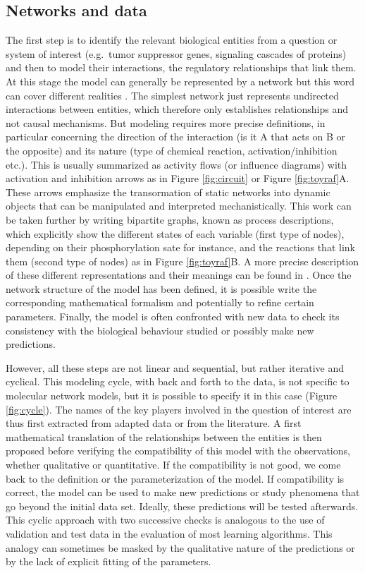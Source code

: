 \documentclass[a4paper,12pt,twoside,onecolumn,openright,final,oldfontcommands]{memoir}
\begin{document}
\subsection{Networks and data}\label{networks-and-data}

The first step is to identify the relevant biological entities from a
question or system of interest (e.g.~tumor suppressor genes, signaling
cascades of proteins) and then to model their interactions, the
regulatory relationships that link them. At this stage the model can
generally be represented by a network but this word can cover different
realities \citep{le2015quantitative}. The simplest network just
represents undirected interactions between entities, which therefore
only establishes relationships and not causal mechanisms. But modeling
requires more precise definitions, in particular concerning the
direction of the interaction (is it A that acts on B or the opposite)
and its nature (type of chemical reaction, activation/inhibition etc.).
This is usually summarized as activity flows (or influence diagrams)
with activation and inhibition arrows as in Figure \ref{fig:circuit} or
Figure \ref{fig:toyraf}A. These arrows emphasize the transormation of
static networks into dynamic objects that can be manipulated and
interpreted mechanistically. This work can be taken further by writing
bipartite graphs, known as process descriptions, which explicitly show
the different states of each variable (first type of nodes), depending
on their phosphorylation sate for instance, and the reactions that link
them (second type of nodes) as in Figure \ref{fig:toyraf}B. A more
precise description of these different representations and their
meanings can be found in \citet{le2015quantitative}. Once the network
structure of the model has been defined, it is possible write the
corresponding mathematical formalism and potentially to refine certain
parameters. Finally, the model is often confronted with new data to
check its consistency with the biological behaviour studied or possibly
make new predictions.

However, all these steps are not linear and sequential, but rather
iterative and cyclical. This modeling cycle, with back and forth to the
data, is not specific to molecular network models, but it is possible to
specify it in this case (Figure \ref{fig:cycle}). The names of the key
players involved in the question of interest are thus first extracted
from adapted data or from the literature. A first mathematical
translation of the relationships between the entities is then proposed
before verifying the compatibility of this model with the observations,
whether qualitative or quantitative. If the compatibility is not good,
we come back to the definition or the parameterization of the model. If
compatibility is correct, the model can be used to make new predictions
or study phenomena that go beyond the initial data set. Ideally, these
predictions will be tested afterwards. This cyclic approach with two
successive checks is analogous to the use of validation and test data in
the evaluation of most learning algorithms. This analogy can sometimes
be masked by the qualitative nature of the predictions or by the lack of
explicit fitting of the parameters.
\end{document}
